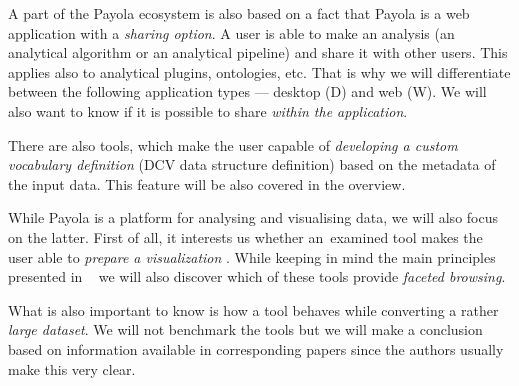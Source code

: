 A part of the Payola ecosystem is also based on a fact that Payola is a web 
application with a \emph{sharing option}. A user is able to make an analysis (an
analytical algorithm or an analytical pipeline) and share it with other users. This applies also to 
analytical plugins, ontologies, etc. That is why we will differentiate between the following
application types --- desktop (D) and web (W). We will also want to 
know if it is possible to share \emph{within the application}.

There are also tools, which make the user capable of \emph{developing a custom vocabulary 
definition} (DCV data structure definition) based on the metadata of the input data.
This feature will be also covered in the overview.

While Payola is a platform for analysing and visualising data, we will also 
focus on the latter. First of all, it interests us whether 
an~examined tool makes the user able to \emph{prepare a visualization} . While keeping 
in mind the main principles presented in ~\cite{mantra} we will also discover 
which of these tools provide \emph{faceted browsing}.

What is also important to know is how a tool behaves while converting a rather 
\emph{large dataset}. We will not benchmark the tools but we will make a conclusion based 
on information available in corresponding papers since the authors usually make 
this very clear.


